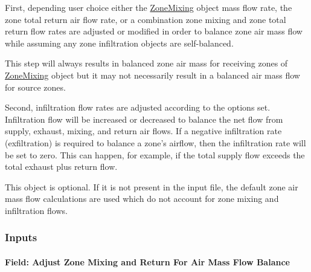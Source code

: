First, depending user choice either the \hyperref[zonemixing]{ZoneMixing} object mass flow rate, the zone total return air flow rate, or a combination zone mixing and zone total return flow rates are adjusted or modified in order to balance zone air mass flow while assuming any zone infiltration objects are self-balanced. 

This step will always results in balanced zone air mass for receiving zones of \hyperref[zonemixing]{ZoneMixing} object but it may not necessarily result in a balanced air mass flow for source zones.~

Second, infiltration flow rates are adjusted according to the options set. Infiltration flow will be increased or decreased to balance the net flow from supply, exhaust, mixing, and return air flows. If a negative infiltration rate (exfiltration) is required to balance a zone's airflow, then the infiltration rate will be set to zero. This can happen, for example, if the total supply flow exceeds the total exhaust plus return flow.

This object is optional. If it is not present in the input file, the default zone air mass flow calculations are used which do not account for zone mixing and infiltration flows.

\subsubsection{Inputs}\label{inputs-9-002}

\paragraph{Field: Adjust Zone Mixing and Return For Air Mass Flow Balance}\label{field-adjust-zone-mixing-and-return-for-air-mass-flow-balance}

